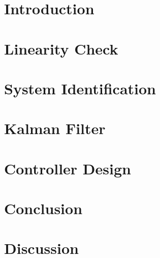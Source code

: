 \documentclass[a4paper]{article}
\begin{document}
\newpage
\tableofcontents
\newpage

\section{Introduction}


\section{Linearity Check}


\section{System Identification}





\newpage

\section{Kalman Filter}



\section{Controller Design}


\clearpage

 \clearpage
 \newpage
\section{Conclusion}

\section{Discussion}




\end{document}
